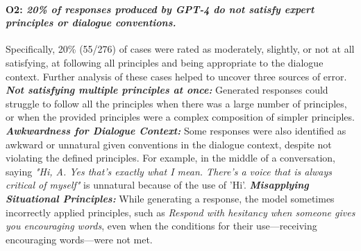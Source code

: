 \documentclass[11pt]{article}
\begin{document}
\paragraph{O2: \textit{20\% of responses produced by GPT-4 do not satisfy expert principles or dialogue conventions.}} \label{sec:pilot-o2}
Specifically, 20\% (55/276) of cases were rated as moderately, slightly, or not at all satisfying, at following all principles and being appropriate to the dialogue context. Further analysis of these cases helped to uncover three sources of error.
 \textit{\textbf{Not satisfying multiple principles at once:}} Generated responses could struggle to follow all the principles when there was a large number of principles, or when the provided principles were a complex composition of simpler principles. 
 \textit{\textbf{Awkwardness for Dialogue Context:}} Some responses were also identified as awkward or unnatural given conventions in the dialogue context,  despite not violating the defined principles. For example, in the middle of a conversation, saying
\textit{"Hi, A. Yes that's exactly what I mean. There's a voice that is always critical of myself"} is unnatural because of the use of 'Hi'.
\textit{\textbf{Misapplying Situational Principles:}} While generating a response, the model sometimes incorrectly applied principles, such as \textit{Respond with hesitancy when someone gives you encouraging words}, even when the conditions for their use—receiving encouraging words—were not met.
\end{document}
